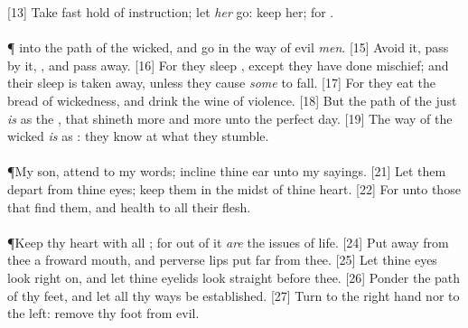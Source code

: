 [13] \textcolor[cmyk]{0.99998,1,0,0}{Take fast hold of instruction; let \emph{her}  go: keep her; for .}\\
\\
\P \textcolor[cmyk]{0.99998,1,0,0}{ into the path of the wicked, and go  in the way of evil \emph{men}.}
[15] \textcolor[cmyk]{0.99998,1,0,0}{Avoid it, pass  by it, , and pass away.}
[16] \textcolor[cmyk]{0.99998,1,0,0}{For they sleep , except they have done mischief; and their sleep is taken away, unless they cause \emph{some} to fall.}
[17] \textcolor[cmyk]{0.99998,1,0,0}{For they eat the bread of wickedness, and drink the wine of violence.}
[18] \textcolor[cmyk]{0.99998,1,0,0}{But the path of the just \emph{is} as the , that shineth more and more unto the perfect day.}
[19] \textcolor[cmyk]{0.99998,1,0,0}{The way of the wicked \emph{is} as : they know  at what they stumble.}\\
\\
\P \textcolor[cmyk]{0.99998,1,0,0}{My son, attend to my words; incline thine ear unto my sayings.}
[21] \textcolor[cmyk]{0.99998,1,0,0}{Let them  depart from thine eyes; keep them in the midst of thine heart.}
[22] \textcolor[cmyk]{0.99998,1,0,0}{For  unto those that find them, and health to all their flesh.}\\
\\
\P \textcolor[cmyk]{0.99998,1,0,0}{Keep thy heart with all ; for out of it \emph{are} the issues of life.}
[24] \textcolor[cmyk]{0.99998,1,0,0}{Put away from thee a froward mouth, and perverse lips put far from thee.}
[25] \textcolor[cmyk]{0.99998,1,0,0}{Let thine eyes look right on, and let thine eyelids look straight before thee.} 
[26] \textcolor[cmyk]{0.99998,1,0,0}{Ponder the path of thy feet, and let all thy ways be established.}
[27] \textcolor[cmyk]{0.99998,1,0,0}{Turn  to the right hand nor to the left: remove thy foot from evil.}

